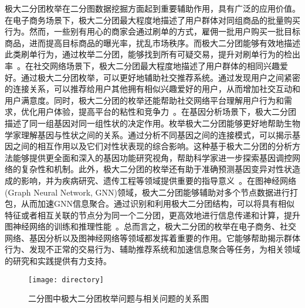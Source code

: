 极大二分团枚举在二分图数据挖掘方面起到重要辅助作用，具有广泛的应用价值。在电子商务场景下，极大二分团最大程度地描述了用户群体对同组商品的批量购买行为。然而，一些别有用心的商家会通过刷单的方式，雇佣一批用户购买一批目标商品，进而提高目标商品的曝光率，扰乱市场秩序。而极大二分团能够有效地描述此类刷单行为，通过枚举二分团，能够找到所有可疑交易，提升对刷单行为的检出率~\cite{MEB20,MEB22}。在社交网络场景下，极大二分团最大程度地描述了用户群体的相同兴趣爱好。通过极大二分团枚举，可以更好地辅助社交推荐系统。通过发现用户之间紧密的连接关系，可以推荐给用户其他拥有相似兴趣爱好的用户，从而增加社交互动和用户满意度。同时，极大二分团的枚举还能帮助社交网络平台理解用户行为和需求，优化用户体验，提高平台的粘性和竞争力~\cite{Recommend06}。在基因分析场景下，极大二分团描述了同一组基因对同一组性状的决定作用。枚举极大二分团能够更好地帮助生物学家理解基因与性状之间的关系。通过分析不同基因之间的连接模式，可以揭示基因之间的相互作用以及它们对性状表现的综合影响。这种基于极大二分团的分析方法能够提供更全面和深入的基因功能研究视角，帮助科学家进一步探索基因调控网络的复杂性和机制。此外，极大二分团的枚举还有助于准确预测基因变异对性状造成的影响，并为疾病研究、遗传工程等领域提供重要的指导意义~\cite{iMBEA14}。在图神经网络(Graph Neural Network, GNN)领域，极大二分团能够辅助对多个节点数据进行打包，从而加速GNN信息聚合。通过识别和利用极大二分团结构，可以将具有相似特征或者相互关联的节点分为同一个二分团，更高效地进行信息传递和计算，提升图神经网络的训练和推理性能~\cite{PQ21}。总而言之，极大二分团的枚举在电子商务、社交网络、基因分析以及图神经网络等领域都发挥着重要的作用。它能够帮助揭示群体行为、发现不正常的交易行为、辅助推荐系统和加速信息聚合等任务，为相关领域的研究和实践提供有力支持。

\begin{figure} [h]
  \vspace{5pt}
  \centering
  \texttt{[image: directory]}
  \vspace{10pt}
  \caption{二分图中极大二分团枚举问题与相关问题的关系图}
  \label{fig:directory}
\end{figure}

